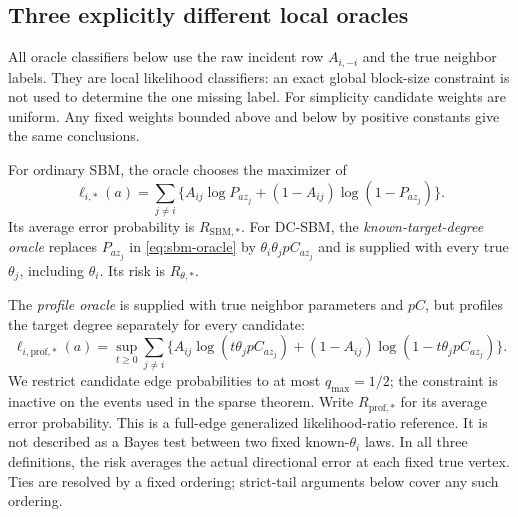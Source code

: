 \subsection{Three explicitly different local oracles}\label{sec:oracle}

All oracle classifiers below use the raw incident row $A_{i,-i}$ and the
true neighbor labels. They are local likelihood classifiers: an exact global
block-size constraint is not used to determine the one missing label.
For simplicity candidate weights are uniform. Any fixed weights bounded
above and below by positive constants give the same conclusions.

For ordinary SBM, the oracle chooses the maximizer of
\begin{equation}\label{eq:sbm-oracle}
 \ell_{i,*}(a)=\sum_{j\ne i}
 \{A_{ij}\log P_{a z_j}+(1-A_{ij})\log(1-P_{a z_j})\}.
\end{equation}
Its average error probability is $R_{\mathrm{SBM},*}$.
For DC-SBM, the \emph{known-target-degree oracle} replaces $P_{a z_j}$ in
\eqref{eq:sbm-oracle} by $\theta_i\theta_j p C_{a z_j}$ and is supplied
with every true $\theta_j$, including $\theta_i$. Its risk is
$R_{\theta,*}$.

The \emph{profile oracle} is supplied with true neighbor parameters and
$pC$, but profiles the target degree separately for every candidate:
\begin{equation}\label{eq:profile-oracle}
 \ell_{i,\mathrm{prof},*}(a)=
 \sup_{t\ge0}\sum_{j\ne i}
 \{A_{ij}\log(t\theta_jpC_{a z_j})
 +(1-A_{ij})\log(1-t\theta_jpC_{a z_j})\}.
\end{equation}
We restrict candidate edge probabilities to at most $q_{\max}=1/2$; the
constraint is inactive on the events used in the sparse theorem. Write
$R_{\mathrm{prof},*}$ for its average error probability. This is a
full-edge generalized likelihood-ratio reference. It is not described as a
Bayes test between two fixed known-$\theta_i$ laws. In all three definitions,
the risk averages the actual directional error at each fixed true vertex.
Ties are resolved by a fixed ordering; strict-tail arguments below cover
any such ordering.

